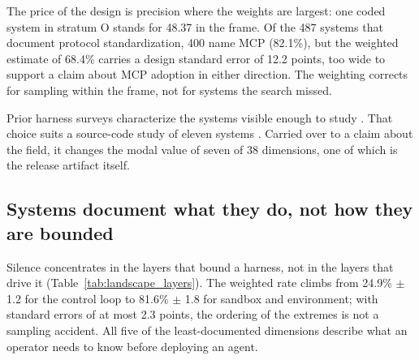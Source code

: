 The price of the design is precision where the weights are largest: one coded system in stratum O
stands for 48.37 in the frame. Of the 487 systems that document protocol standardization, 400 name MCP
(82.1\%), but the weighted estimate of 68.4\% carries a design standard error of 12.2 points, too wide
to support a claim about MCP adoption in either direction. The weighting corrects for sampling within
the frame, not for systems the search missed.

Prior harness surveys characterize the systems visible enough to study
\citep{li2026harnessengineering,meng2026harnesssurvey,guo2026qa2task,rombaut2026insidescaffold,barbaste2026anatomy,zhong2026responsibilities,harnesscategorical2026}.
That choice suits a source-code study of eleven systems \citep{barbaste2026anatomy}. Carried over to a
claim about the field, it changes the modal value of seven of 38 dimensions, one of which is the
release artifact itself.

\subsection{Systems document what they do, not how they are bounded}
\label{subsec:underreporting}

Silence concentrates in the layers that bound a harness, not in the layers that drive it
(Table~\ref{tab:landscape_layers}). The weighted rate climbs from 24.9\% $\pm$ 1.2 for the control loop
to 81.6\% $\pm$ 1.8 for sandbox and environment; with standard errors of at most 2.3 points, the
ordering of the extremes is not a sampling accident. All five of the least-documented dimensions
describe what an operator needs to know before deploying an agent.

